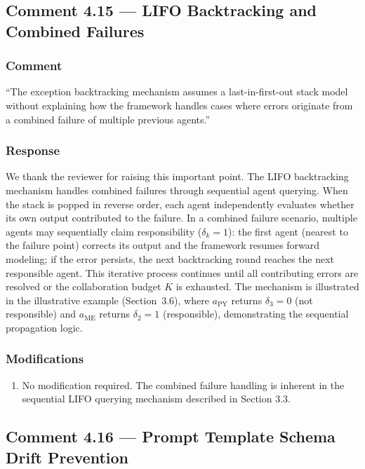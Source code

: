 \documentclass[11pt,a4paper]{article}
\begin{document}
\subsection{Comment 4.15 --- LIFO Backtracking and Combined Failures}

\subsubsection{Comment}
``The exception backtracking mechanism assumes a last-in-first-out stack model without explaining how the framework handles cases where errors originate from a combined failure of multiple previous agents.''

\subsubsection{Response}
We thank the reviewer for raising this important point. The LIFO backtracking mechanism handles combined failures through sequential agent querying. When the stack is popped in reverse order, each agent independently evaluates whether its own output contributed to the failure. In a combined failure scenario, multiple agents may sequentially claim responsibility ($\delta_k=1$): the first agent (nearest to the failure point) corrects its output and the framework resumes forward modeling; if the error persists, the next backtracking round reaches the next responsible agent. This iterative process continues until all contributing errors are resolved or the collaboration budget $K$ is exhausted. The mechanism is illustrated in the illustrative example (Section~3.6), where $a_{\text{PY}}$ returns $\delta_3=0$ (not responsible) and $a_{\text{ME}}$ returns $\delta_2=1$ (responsible), demonstrating the sequential propagation logic.

\subsubsection{Modifications}
\begin{enumerate}
\item No modification required. The combined failure handling is inherent in the sequential LIFO querying mechanism described in Section 3.3.
\end{enumerate}

\subsection{Comment 4.16 --- Prompt Template Schema Drift Prevention}
\end{document}

